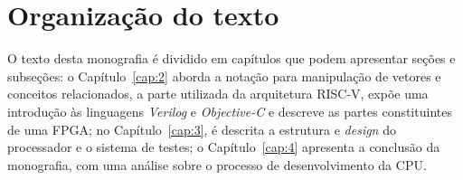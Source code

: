 \section{Organização do texto}
\label{sec:it}

O texto desta monografia é dividido em capítulos que podem apresentar seções e subseções: 
o Capítulo~\ref{cap:2} aborda a notação para manipulação de vetores e conceitos relacionados,
a parte utilizada da arquitetura RISC-V, expõe uma introdução às linguagens \emph{Verilog}
e \emph{Objective-C} e descreve as partes constituintes de uma FPGA; no Capítulo~\ref{cap:3}, 
é descrita a estrutura e \emph{design} do processador e o sistema de testes;
o Capítulo~\ref{cap:4} apresenta a conclusão da monografia, com uma análise sobre o processo de
desenvolvimento da CPU.